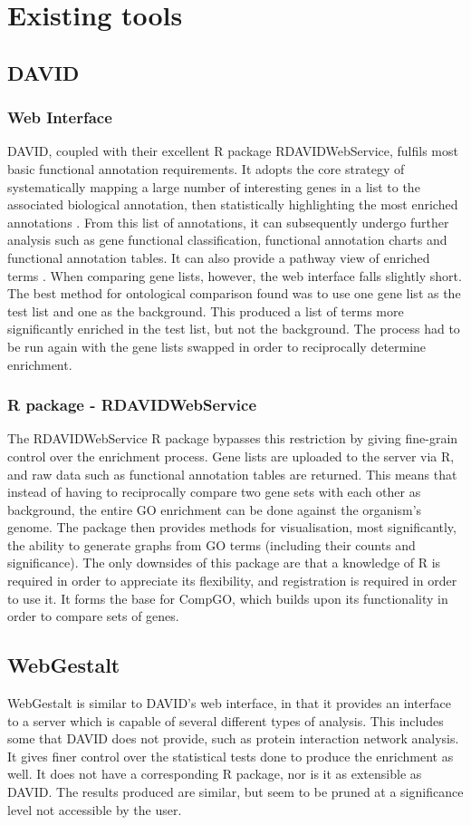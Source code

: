 \documentclass[11pt, oneside]{article}
\begin{document}
\section*{Existing tools}
\subsection*{DAVID}
\subsubsection*{Web Interface}
DAVID, coupled with their excellent R package RDAVIDWebService, fulfils most basic functional annotation requirements. It adopts the core strategy of systematically mapping a large number of interesting genes in a list to the associated biological annotation, then statistically highlighting the most enriched annotations \cite{David08}. From this list of annotations, it can subsequently undergo further analysis such as gene functional classification, functional annotation charts and functional annotation tables. It can also provide a pathway view of enriched terms \cite{David08}. When comparing gene lists, however, the web interface falls slightly short. The best method for ontological comparison found was to use one gene list as the test list and one as the background. This produced a list of terms more significantly enriched in the test list, but not the background. The process had to be run again with the gene lists swapped in order to reciprocally determine enrichment.
\subsubsection*{R package - RDAVIDWebService}
The RDAVIDWebService R package bypasses this restriction by giving fine-grain control over the enrichment process. Gene lists are uploaded to the server via R, and raw data such as functional annotation tables are returned. This means that instead of having to reciprocally compare two gene sets with each other as background, the entire GO enrichment can be done against the organism's genome. The package then provides methods for visualisation, most significantly, the ability to generate graphs from GO terms (including their counts and significance). The only downsides of this package are that a knowledge of R is required in order to appreciate its flexibility, and registration is required in order to use it. It forms the base for CompGO, which builds upon its functionality in order to compare sets of genes.
\subsection*{WebGestalt}
WebGestalt is similar to DAVID's web interface, in that it provides an interface to a server which is capable of several different types of analysis. This includes some that DAVID does not provide, such as protein interaction network analysis. It gives finer control over the statistical tests done to produce the enrichment as well. It does not have a corresponding R package, nor is it as extensible as DAVID. The results produced are similar, but seem to be pruned at a significance level not accessible by the user.
\end{document}
